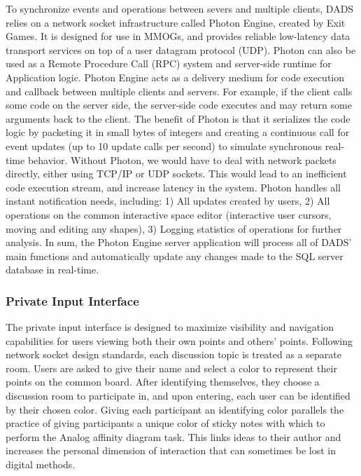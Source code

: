 \documentclass{sigchi}
\begin{document}
To synchronize events and operations between severs and multiple clients, DADS relies on a network
socket infrastructure called Photon Engine, created by Exit Games. It is designed for use in MMOGs, and provides reliable low-latency data transport services on top of a user datagram protocol (UDP). Photon can also be used as a Remote Procedure Call (RPC) system and server-side runtime for Application logic. Photon Engine acts as a delivery medium for code execution and callback between multiple clients and servers. For example, if the client calls some code on the server side, the server-side code executes and may return some arguments back to the client. The benefit of Photon is that it serializes the code logic by packeting it in small bytes of integers and creating a continuous call for event updates (up to 10 update calls per second) to simulate synchronous real-time behavior. Without Photon, we would have to deal with network packets directly, either using TCP/IP or UDP sockets. This would lead to an inefficient code execution stream, and increase latency in the system. Photon handles all instant notification needs, including: 1) All updates created by users, 2) All operations on the common interactive space editor (interactive user cursors, moving and editing any shapes), 3) Logging statistics of operations for further analysis. In sum, the Photon Engine server application will process all of DADS' main functions and automatically update any changes made to the SQL server database in real-time.


\subsubsection{Private Input Interface}

The private input interface is designed to maximize visibility and navigation capabilities for users viewing both their own points and others' points. Following network socket design standards, each discussion topic is treated as a separate room. Users are asked to give their name and select a color to represent their points on the common board. After identifying themselves, they choose a discussion room to participate in, and upon entering, each user can be identified by their chosen color. Giving each participant an identifying color parallels the practice of giving participants a unique color of sticky notes with which to perform the Analog affinity diagram task. This links ideas to their author and increases the personal dimension of interaction that can sometimes be lost in digital methods\cite{ballendat2010proxemic}.  
\end{document}
